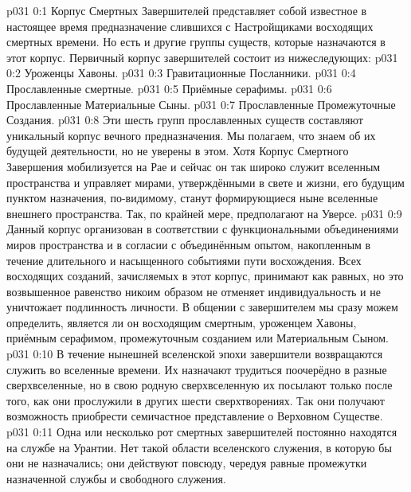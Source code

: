 \author{Божественный Советник и Не Имеющий Имени и Номера}
\vs p031 0:1 Корпус Смертных Завершителей представляет собой известное в настоящее время предназначение слившихся с Настройщиками восходящих смертных времени. Но есть и другие группы существ, которые назначаются в этот корпус. Первичный корпус завершителей состоит из нижеследующих:
\vs p031 0:2 Уроженцы Хавоны.
\vs p031 0:3 Гравитационные Посланники.
\vs p031 0:4 Прославленные смертные.
\vs p031 0:5 Приёмные серафимы.
\vs p031 0:6 Прославленные Материальные Сыны.
\vs p031 0:7 Прославленные Промежуточные Создания.
\vs p031 0:8 \pc Эти шесть групп прославленных существ составляют уникальный корпус вечного предназначения. Мы полагаем, что знаем об их будущей деятельности, но не уверены в этом. Хотя Корпус Смертного Завершения мобилизуется на Рае и сейчас он так широко служит вселенным пространства и управляет мирами, утверждёнными в свете и жизни, его будущим пунктом назначения, по\hyp{}видимому, станут формирующиеся ныне вселенные внешнего пространства. Так, по крайней мере, предполагают на Уверсе.
\vs p031 0:9 Данный корпус организован в соответствии с функциональными объединениями миров пространства и в согласии с объединённым опытом, накопленным в течение длительного и насыщенного событиями пути восхождения. Всех восходящих созданий, зачисляемых в этот корпус, принимают как равных, но это возвышенное равенство никоим образом не отменяет индивидуальность и не уничтожает подлинность личности. В общении с завершителем мы сразу можем определить, является ли он восходящим смертным, уроженцем Хавоны, приёмным серафимом, промежуточным созданием или Материальным Сыном.
\vs p031 0:10 В течение нынешней вселенской эпохи завершители возвращаются служить во вселенные времени. Их назначают трудиться поочерёдно в разные сверхвселенные, но в свою родную сверхвселенную их посылают только после того, как они прослужили в других шести сверхтворениях. Так они получают возможность приобрести семичастное представление о Верховном Существе.
\vs p031 0:11 Одна или несколько рот смертных завершителей постоянно находятся на службе на Урантии. Нет такой области вселенского служения, в которую бы они не назначались; они действуют повсюду, чередуя равные промежутки назначенной службы и свободного служения.
